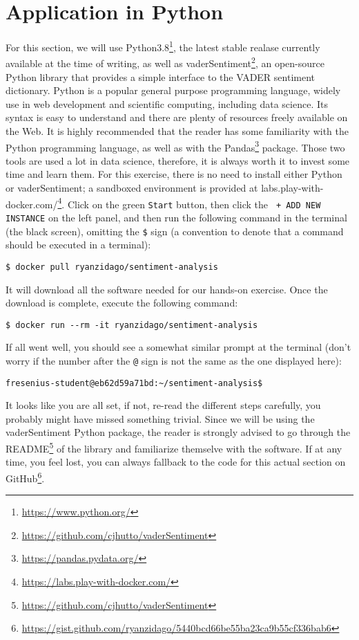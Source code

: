 	\section{Application in Python}\label{sec:applicationsinR}
	For this section, we will use Python3.8\footnote{\href{https://www.python.org/}{https://www.python.org/}}, the latest stable realase currently available at the time of writing, as well as vaderSentiment\footnote{\href{https://github.com/cjhutto/vaderSentiment}{https://github.com/cjhutto/vaderSentiment}}, an open-source Python library that provides a simple interface to the VADER sentiment dictionary. Python is a popular general purpose programming language, widely use in web development and scientific computing, including data science. Its syntax is easy to understand and there are plenty of resources freely available on the Web. It is highly recommended that the reader has some familiarity with the Python programming language, as well as with the Pandas\footnote{\href{https://pandas.pydata.org/}{https://pandas.pydata.org/}} package. Those two tools are used a lot in data science, therefore, it is always worth it to invest some time and learn them. For this exercise, there is no need to install either Python or vaderSentiment; a sandboxed environment is provided at labs.play-with-docker.com/\footnote{\href{https://labs.play-with-docker.com/}{https://labs.play-with-docker.com/}}. Click on the green \verb#Start# button, then click the \verb# + ADD NEW INSTANCE# on the left panel, and then run the following command in the terminal (the black screen), omitting the \verb#$# sign (a convention to denote that a command should be executed in a terminal):
	\begin{Verbatim}
$ docker pull ryanzidago/sentiment-analysis
	\end{Verbatim}
	It will download all the software needed for our hands-on exercise. Once the download is complete, execute the following command:
	\begin{Verbatim}
$ docker run --rm -it ryanzidago/sentiment-analysis
	\end{Verbatim}
	If all went well, you should see a somewhat similar prompt at the terminal (don't worry if the number after the \verb#@# sign is not the same as the one displayed here):
	\begin{Verbatim}
fresenius-student@eb62d59a71bd:~/sentiment-analysis$
	\end{Verbatim}

	It looks like you are all set, if not, re-read the different steps carefully, you probably might have missed something trivial. Since we will be using the vaderSentiment Python package, the reader is strongly advised to go through the README\footnote{\href{https://github.com/cjhutto/vaderSentiment}{https://github.com/cjhutto/vaderSentiment}} of the library and familiarize themselve with the software. If at any time, you feel lost, you can always fallback to the code for this actual section on GitHub\footnote{\href{https://gist.github.com/ryanzidago/5440bcd66be55ba23ca9b55cf336bab6}{https://gist.github.com/ryanzidago/5440bcd66be55ba23ca9b55cf336bab6}}.

